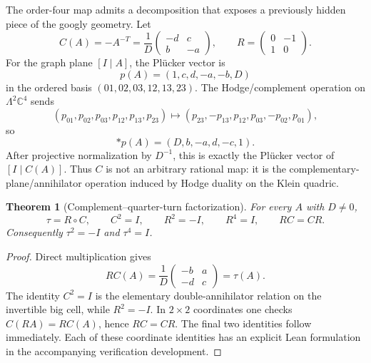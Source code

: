 \documentclass[11pt]{article}
\newtheorem{theorem}{Theorem}[section]
\theoremstyle{definition}\newtheorem{definition}[theorem]{Definition}
\theoremstyle{remark}\newtheorem{remark}[theorem]{Remark}\newtheorem{conjecture}[theorem]{Conjecture}
\begin{document}
The order-four map admits a decomposition that exposes a previously hidden piece of the googly geometry. Let
\begin{equation}\label{eq:grasscomplement}
 C(A)=-A^{-T}=\frac1D\begin{pmatrix}-d&c\\ b&-a\end{pmatrix},
 \qquad
 R=\begin{pmatrix}0&-1\\1&0\end{pmatrix}.
\end{equation}
For the graph plane $[I\mid A]$, the Pl\"ucker vector is
\begin{equation}
 p(A)=(1,c,d,-a,-b,D)
\end{equation}
in the ordered basis $(01,02,03,12,13,23)$. The Hodge/complement operation on $\Lambda^2\mathbb C^4$ sends
\begin{equation}
 (p_{01},p_{02},p_{03},p_{12},p_{13},p_{23})
 \longmapsto
 (p_{23},-p_{13},p_{12},p_{03},-p_{02},p_{01}),
\end{equation}
so
\begin{equation}
 *p(A)=(D,b,-a,d,-c,1).
\end{equation}
After projective normalization by $D^{-1}$, this is exactly the Pl\"ucker vector of $[I\mid C(A)]$. Thus $C$ is not an arbitrary rational map: it is the complementary-plane/annihilator operation induced by Hodge duality on the Klein quadric.

\begin{theorem}[Complement--quarter-turn factorization]\label{thm:tauFactor}
For every $A$ with $D\neq0$,
\begin{equation}\label{eq:taufactor}
 \boxed{\tau=R\circ C},
 \qquad C^2=I,
 \qquad R^2=-I,
 \qquad R^4=I,
 \qquad RC=CR.
\end{equation}
Consequently $\tau^2=-I$ and $\tau^4=I$.
\end{theorem}
\begin{proof}
Direct multiplication gives
\begin{equation}
 R C(A)=\frac1D\begin{pmatrix}-b&a\\-d&c\end{pmatrix}=\tau(A).
\end{equation}
The identity $C^2=I$ is the elementary double-annihilator relation on the invertible big cell, while $R^2=-I$. In $2\times2$ coordinates one checks $C(RA)=RC(A)$, hence $RC=CR$. The final two identities follow immediately. Each of these coordinate identities has an explicit Lean formulation in the accompanying verification development.
\end{proof}
\end{document}
